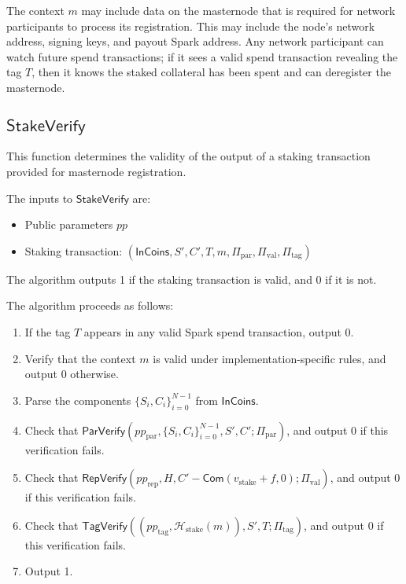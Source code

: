 \documentclass{article}
\newcommand{\func}[1]{\mathsf{#1}}
\newcommand{\com}{\func{Com}}
\newcommand{\hash}{\mathcal{H}}
\theoremstyle{remark}
\begin{document}
The context $m$ may include data on the masternode that is required for network participants to process its registration.
This may include the node's network address, signing keys, and payout Spark address.
Any network participant can watch future spend transactions; if it sees a valid spend transaction revealing the tag $T$, then it knows the staked collateral has been spent and can deregister the masternode.


\subsection{\texorpdfstring{$\func{StakeVerify}$}{StakeVerify}}

This function determines the validity of the output of a staking transaction provided for masternode registration.

The inputs to $\func{StakeVerify}$ are:
\begin{itemize}
    \item Public parameters $pp$
    \item Staking transaction: $(\func{InCoins},S',C',T,m,\Pi_{\text{par}},\Pi_{\text{val}},\Pi_{\text{tag}})$
\end{itemize}
The algorithm outputs 1 if the staking transaction is valid, and 0 if it is not.

The algorithm proceeds as follows:
\begin{enumerate}
    \item If the tag $T$ appears in any valid Spark spend transaction, output 0.
    \item Verify that the context $m$ is valid under implementation-specific rules, and output 0 otherwise.
    \item Parse the components $\{S_i,C_i\}_{i=0}^{N-1}$ from $\func{InCoins}$.
    \item Check that $\func{ParVerify}(pp_{\text{par}},\{S_i,C_i\}_{i=0}^{N-1},S',C' ; \Pi_{\text{par}})$, and output 0 if this verification fails.
    \item Check that $\func{RepVerify}(pp_{\text{rep}},H,C'-\com(v_{\text{stake}} + f,0) ; \Pi_{\text{val}})$, and output 0 if this verification fails.
    \item Check that $\func{TagVerify}((pp_{\text{tag}},\hash_{\text{stake}}(m)),S',T ; \Pi_{\text{tag}})$, and output 0 if this verification fails.
    \item Output 1.
\end{enumerate}
\end{document}
